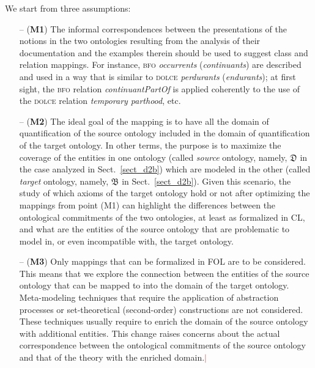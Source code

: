 \documentclass[ao]{iosart2x}
\newcommand{\nb}[1]{\textcolor{red}{$|$}\marginpar{\hspace*{-0cm}\parbox{20mm}{\scriptsize\raggedright\textcolor{red}{#1}}}}
\newcommand{\dolce}{{\textsc{dolce}}}
\newcommand{\bfo}{{\textsc{bfo}}}
\newcommand {\thdolce} {\ensuremath{\mathfrak{D}}}
\newcommand {\thbfo} {\ensuremath{\mathfrak{B}}}
\begin{document}
We start from three assumptions:
%
\begin{itemize}
\item[--] ({\bf M1}) The informal correspondences between the presentations of the notions in the two ontologies resulting from the analysis of their documentation and the examples therein should be used to suggest class and relation mappings. 
For instance, {\bfo} \emph{occurrents} (\emph{continuants}) are described and used in a way that is similar to {\dolce} \emph{perdurants} (\emph{endurants}); at first sight, the {\bfo} relation \emph{continuantPartOf} is applied coherently to the use of the {\dolce} relation \emph{temporary parthood}, etc. 


\item[--] ({\bf M2}) The ideal goal of the mapping is to have all the domain of quantification of the source ontology included in the domain of quantification of the target ontology. In other terms, the purpose is to maximize the coverage of the entities in one ontology (called \emph{source} ontology, namely, {$\thdolce$} in the case analyzed in Sect.~\ref{sect_d2b}) which are modeled in the other (called \emph{target} ontology, namely, {$\thbfo$} in Sect.~\ref{sect_d2b}). 
Given this scenario, the study of which axioms of the target ontology hold or not after optimizing the mappings from point (M1) can highlight the differences between the ontological commitments of the two ontologies, at least as formalized in CL, and what are the entities of the source ontology that are problematic to model in, or even incompatible with, the target ontology.   

\item[--] ({\bf M3}) Only mappings that can be formalized in FOL are to be considered. This means that we explore the connection between the entities of the source ontology that can be mapped to into the domain of the target ontology. Meta-modeling techniques that require the application of abstraction processes or set-theoretical (second-order) constructions are not considered. These techniques usually require to enrich the domain of the source ontology with additional entities. This change raises concerns about the actual correspondence between the ontological commitments of the source ontology and that of the theory with the enriched domain.\nb{CM: questo ultimo commento non mi convince, abbiamo cercato di restare a FOL perché: (1) possiamo sperare di farci aiutare dai TPs; (2) sfruttiamo l'idea classica di definitional extension (invece che passare a teoremi di rappresentazione che comunque avrebbero senso)} 
\end{itemize}
\end{document}

